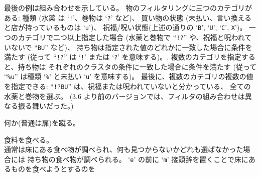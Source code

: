 最後の例は組み合わせを示している。
物のフィルタリングに三つのカテゴリがある:
種類 (水薬 は `{\tt !}'、巻物は `{\tt ?}' など)、
買い物の状態 (未払い、言い換えると店が持っているものは `{\tt u}')、
祝福/呪い状態(上述の通りの `{\tt B}', `{\tt U}', `{\tt C}', {\tt X}')。
一つのカテゴリで二つ以上指定した場合
(水薬と巻物で ``{\tt !?}'' や、祝福と呪われていないで ``{\tt BU}'' など)、
持ち物は指定された値のどれかに一致した場合に条件を満たす
(従って ``{\tt !?}'' は `{\tt !}' または `{\tt ?}' を意味する)。.
複数のカテゴリを指定すると、持ち物は
それぞれのクラスタの条件に一致した場合に条件を満たす
(従って ``{\tt \%u}'' は種類 `{\tt \%}' と未払い `{\tt u}' を意味する)。
最後に、複数のカテゴリの複数の値を指定できる:
``{\tt !?BU}'' は、祝福または呪われていないと分かっている、
全ての水薬と巻物を選ぶ。
(3.6 より前のバージョンでは、フィルタの組み合わせは異なる振る舞いだった。)
\item[\tb{\^{}D}]
何か(普通は扉)を蹴る。
\item[\tb{e}]
食料を食べる。\\
通常は床にある食べ物が調べられ、何も見つからないかどれも選ばなかった場合には
持ち物の食べ物が調べられる。
`{\tt e}' の前に `{\tt m}' 接頭辞を置くことで床にあるものを食べようとするのを
